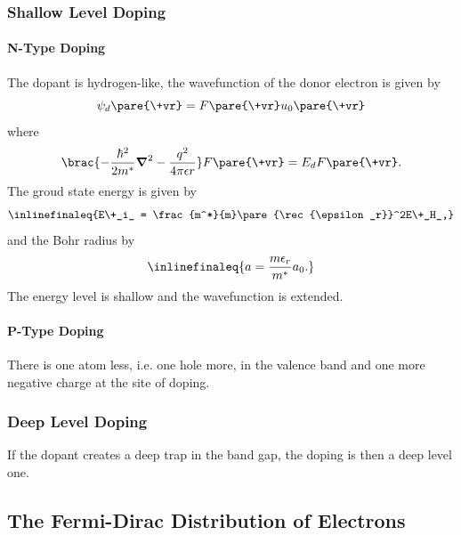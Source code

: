 \documentclass[hidelinks]{article}
\begin{document}

\subsubsection{Shallow Level Doping} %
\label{ssub:shallow_level_doping}

\paragraph{N-Type Doping} %
\label{par:n_type_doping}

The dopant is hydrogen-like, the wavefunction of the donor electron is given by
\[ \psi_d\pare{\+vr} = F\pare{\+vr}u_0\pare{\+vr} \]
where
\[ \brac{-\frac{\hbar^2}{2m^*}\grad^2 - \frac{q^2}{4\pi\epsilon r}}F\pare{\+vr} = E_d F\pare{\+vr}. \]
The groud state energy is given by
\[ \inlinefinaleq{E\+_i_ = \frac{m^*}{m}\pare{\rec{\epsilon_r}}^2E\+_H_,} \]
and the Bohr radius by
\[ \inlinefinaleq{a = \frac{m\epsilon_r}{m^*}a_0.} \]
The energy level is shallow and the wavefunction is extended.


\paragraph{P-Type Doping} %
\label{par:p_type_doping}

There is one atom less, i.e. one hole more, in the valence band and one more negative charge at the site of doping.



\subsubsection{Deep Level Doping} %
\label{ssub:deep_level_doping}

If the dopant creates a deep trap in the band gap, the doping is then a deep level one.



\subsection{The Fermi-Dirac Distribution of Electrons} %
\label{sub:the_fermi_dirac_distribution_of_electrons}
\end{document}
